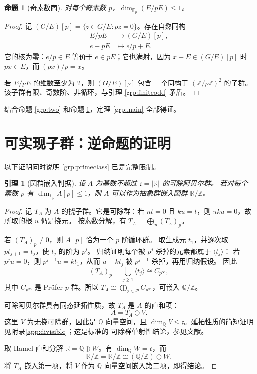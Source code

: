 \documentclass[11pt,a4paper,oneside,openany]{book}
\theoremstyle{lecture}
\newtheorem{proposition}[theorem]{命题}
\newtheorem{lemma}[theorem]{引理}
\newcommand{\Q}{\mathbb Q}
\newcommand{\R}{\mathbb R}
\newcommand{\Z}{\mathbb Z}
\newcommand{\Fp}{\mathbb F_p}
\newcommand{\Circle}{\mathbb R/\mathbb Z}
\newcommand{\cfrak}{\mathfrak c}
\newcommand{\rk}{\operatorname{dim}}
\numberwithin{equation}{section}
\begin{document}
\begin{proposition}[奇素数商]\label{grp:oddp}
对每个奇素数 $p$，$\rk_{\Fp}(E/pE)\le1$。
\end{proposition}

\begin{proof}
记 $(G/E)[p]=\{z\in G/E:pz=0\}$。存在自然同构
\begin{equation}\label{grp:piso}
 \begin{aligned}
 E/pE&\longrightarrow(G/E)[p],\\
 e+pE&\longmapsto e/p+E.
 \end{aligned}
\end{equation}
它的核为零：$e/p\in E$ 等价于 $e\in pE$；它也满射，因为
$x+E\in(G/E)[p]$ 时 $px\in E$，而 $(px)/p=x$。

若 $E/pE$ 的维数至少为 $2$，则 $(G/E)[p]$ 包含
一个同构于 $(\Z/p\Z)^2$ 的子群。该子群有限、奇数阶、非循环，与引理
\ref{grp:finiteodd} 矛盾。
\end{proof}

结合命题 \ref{grp:two} 和命题 \ref{grp:oddp}，定理 \ref{grp:main} 全部得证。

\section{可实现子群：逆命题的证明}

以下证明同时说明 \eqref{grp:primeclass} 已是完整限制。

\begin{lemma}[圆群嵌入判据]\label{grp:circlelemma}
设 $A$ 为基数不超过 $\cfrak=\lvert\R\rvert$ 的可除阿贝尔群。
若对每个素数 $p$ 有 $\rk_{\Fp}A[p]\le1$，则 $A$ 可以作为抽象群嵌入圆群 $\Circle$。
\end{lemma}

\begin{proof}
记 $T_A$ 为 $A$ 的挠子群。它是可除群：若 $nt=0$ 且 $ku=t$，则
$nku=0$，故所取的根 $u$ 仍是挠元。
按素数分解，有
$T_A=\bigoplus_p(T_A)_p$。

若 $(T_A)_p\ne0$，则 $A[p]$ 恰为一个 $p$ 阶循环群。
取生成元 $t_1$，并逐次取 $pt_{j+1}=t_j$，使 $t_j$ 的阶为 $p^j$。
归纳证明每个被 $p^j$ 杀掉的元素都属于 $\langle t_j\rangle$：
若 $p^ju=0$，则 $p^{j-1}u=kt_1$，从而
$u-kt_j$ 被 $p^{j-1}$ 杀掉，再用归纳假设。
因此
\[
 (T_A)_p=\bigcup_{j\ge1}\langle t_j\rangle
 \cong C_{p^\infty},
\]
其中 $C_{p^\infty}$ 是 Prüfer $p$ 群。所以
$T_A\cong\bigoplus_{p\in\mathcal P}C_{p^\infty}$，可嵌入 $\Q/\Z$。

可除阿贝尔群具有同态延拓性质，故 $T_A$ 是 $A$ 的直和项：
\[
 A=T_A\oplus V.
\]
这里 $V$ 为无挠可除群，因此是 $\Q$ 向量空间，且
$\rk_\Q V\le\cfrak$。延拓性质的简短证明见附录\ref{app:divisible}；这是标准的
可除群单射性结论，参见文献\cite{stacks}。

取 Hamel 直和分解 $\R=\Q\oplus W$。有 $\rk_\Q W=\cfrak$，而
\[
 \Circle=\R/\Z\cong(\Q/\Z)\oplus W.
\]
将 $T_A$ 嵌入第一项，将 $V$ 作为 $\Q$ 向量空间嵌入第二项，即得结论。
\end{proof}
\end{document}
